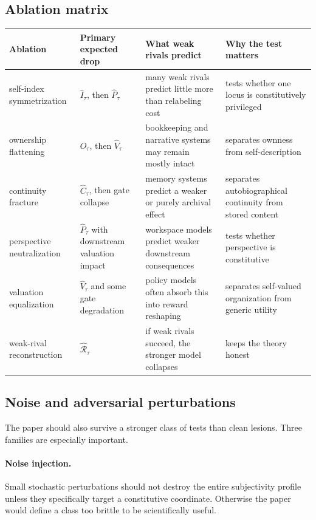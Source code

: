 \documentclass[11pt,a4paper]{article}
\theoremstyle{definition}
\newcommand{\SelfIndex}{I}
\newcommand{\OwnField}{O}
\newcommand{\ContField}{C}
\newcommand{\Persp}{P}
\newcommand{\ValAsym}{V}
\newcommand{\Irred}{\mathcal{R}}
\begin{document}
\subsection{Ablation matrix}
\begin{tabularx}{\textwidth}{@{}p{}p{}p{}Y@{}}
\toprule
\textbf{Ablation} & \textbf{Primary expected drop} & \textbf{What weak rivals predict} & \textbf{Why the test matters} \\
\midrule
self-index symmetrization & $\widehat{\SelfIndex}_\tau$, then $\widehat{\Persp}_\tau$ & many weak rivals predict little more than relabeling cost & tests whether one locus is constitutively privileged \\
ownership flattening & $\widehat{\OwnField}_\tau$, then $\widehat{\ValAsym}_\tau$ & bookkeeping and narrative systems may remain mostly intact & separates ownness from self-description \\
continuity fracture & $\widehat{\ContField}_\tau$, then gate collapse & memory systems predict a weaker or purely archival effect & separates auto\-bio\-graphical continuity from stored content \\
perspective neutralization & $\widehat{\Persp}_\tau$ with downstream valuation impact & workspace models predict weaker downstream consequences & tests whether perspective is constitutive \\
valuation equalization & $\widehat{\ValAsym}_\tau$ and some gate degradation & policy models often absorb this into reward reshaping & separates self-valued organization from generic utility \\
weak-rival reconstruction & $\widehat{\Irred}_\tau$ & if weak rivals succeed, the stronger model collapses & keeps the theory honest \\
\bottomrule
\end{tabularx}

\subsection{Noise and adversarial perturbations}
The paper should also survive a stronger class of tests than clean lesions. Three families are especially important.

\paragraph{Noise injection.}
Small stochastic perturbations should not destroy the entire subjectivity profile unless they specifically target a constitutive coordinate. Otherwise the paper would define a class too brittle to be scientifically useful.
\end{document}
